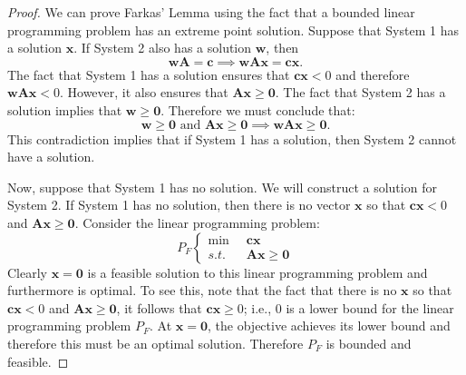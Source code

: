 \begin{proof} We can prove Farkas' Lemma using the fact that a bounded linear programming problem has an extreme point solution. Suppose that System 1 has a solution $\mathbf{x}$. If System 2 also has a solution $\mathbf{w}$, then 
\begin{equation}
\mathbf{w}\mathbf{A} = \mathbf{c} \implies \mathbf{w}\mathbf{A}\mathbf{x} = \mathbf{c}\mathbf{x}.
\end{equation}
The fact that System 1 has a solution ensures that $\mathbf{cx} < 0$ and therefore $\mathbf{w}\mathbf{A}\mathbf{x} < 0$. However, it also ensures that $\mathbf{Ax} \geq \mathbf{0}$. The fact that System 2 has a solution implies that $\mathbf{w} \geq \mathbf{0}$. Therefore we must conclude that:
\begin{equation}
\mathbf{w} \geq \mathbf{0} \text{ and } \mathbf{Ax} \geq \mathbf{0} \implies \mathbf{w}\mathbf{A}\mathbf{x} \geq \mathbf{0}.
\end{equation}
This contradiction implies that if System 1 has a solution, then System 2 cannot have a solution.

Now, suppose that System 1 has no solution. We will construct a solution for System 2. If System 1 has no solution, then there is no vector $\mathbf{x}$ so that $\mathbf{cx} < 0$ and $\mathbf{Ax} \geq \mathbf{0}$. Consider the linear programming problem:
\begin{equation}
P_F\left\{
\begin{aligned}
\min\;\; & \mathbf{cx}\\
s.t.\;\; & \mathbf{Ax} \geq \mathbf{0}
\end{aligned}\right.
\end{equation} 
Clearly $\mathbf{x} = \mathbf{0}$ is a feasible solution to this linear programming problem and furthermore is optimal. To see this, note that the fact that there is no $\mathbf{x}$ so that $\mathbf{cx} < 0$ and $\mathbf{Ax} \geq \mathbf{0}$, it follows that $\mathbf{cx} \geq 0$; i.e., $0$ is a lower bound for the linear programming problem $P_F$. At $\mathbf{x} = \mathbf{0}$, the objective achieves its lower bound and therefore this must be an optimal solution. Therefore $P_F$ is bounded and feasible.


\end{proof}
